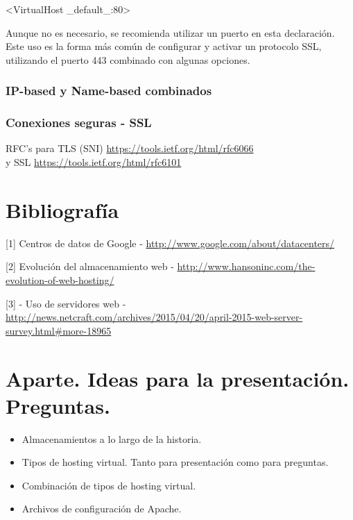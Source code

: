 \documentclass[a4paper, 10pt]{article} %
\begin{document}
<VirtualHost \_default\_:80> 

Aunque no es necesario, se recomienda utilizar un puerto en esta declaración. Este uso es la forma más común de configurar y activar un protocolo SSL, utilizando el puerto 443 combinado con algunas opciones.  

\subsubsection{IP-based y Name-based combinados}

\subsubsection{Conexiones seguras - SSL}

RFC's para TLS (SNI) \url{https://tools.ietf.org/html/rfc6066}\\
y SSL \url{https://tools.ietf.org/html/rfc6101}

\section{Bibliografía}

[1] Centros de datos de Google - \url{http://www.google.com/about/datacenters/}

[2] Evolución del almacenamiento web - \url{http://www.hansoninc.com/the-evolution-of-web-hosting/}

[3] - Uso de servidores web - \url{http://news.netcraft.com/archives/2015/04/20/april-2015-web-server-survey.html\#more-18965}

\section{Aparte. Ideas para la presentación. Preguntas.}
\begin{itemize}
\item Almacenamientos a lo largo de la historia. 
\item Tipos de hosting virtual. Tanto para presentación como para preguntas. 
\item Combinación de tipos de hosting virtual. 
\item Archivos de configuración de Apache.
\end{itemize}
\end{document}
